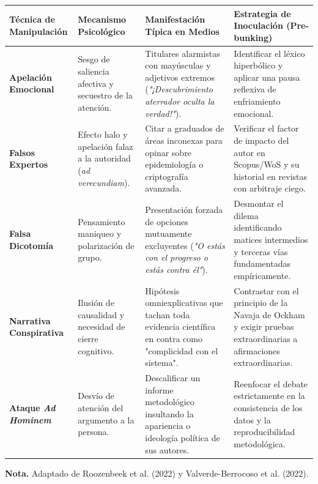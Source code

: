 \begin{table}[htpb!]
\centering
\small
\begin{tabularx}{\textwidth}{p{3.0cm} p{3.2cm} p{4.2cm} X}
\toprule
\textbf{Técnica de Manipulación} & \textbf{Mecanismo Psicológico} & \textbf{Manifestación Típica en Medios} & \textbf{Estrategia de Inoculación (Pre-bunking)} \\
\midrule
\textbf{Apelación Emocional} & Sesgo de saliencia afectiva y secuestro de la atención. & Titulares alarmistas con mayúsculas y adjetivos extremos (\textit{"¡Descubrimiento aterrador oculta la verdad!"}). & Identificar el léxico hiperbólico y aplicar una pausa reflexiva de enfriamiento emocional. \\
\midrule
\textbf{Falsos Expertos} & Efecto halo y apelación falaz a la autoridad (\textit{ad verecundiam}). & Citar a graduados de áreas inconexas para opinar sobre epidemiología o criptografía avanzada. & Verificar el factor de impacto del autor en Scopus/WoS y su historial en revistas con arbitraje ciego. \\
\midrule
\textbf{Falsa Dicotomía} & Pensamiento maniqueo y polarización de grupo. & Presentación forzada de opciones mutuamente excluyentes (\textit{"O estás con el progreso o estás contra él"}). & Desmontar el dilema identificando matices intermedios y terceras vías fundamentadas empíricamente. \\
\midrule
\textbf{Narrativa Conspirativa} & Ilusión de causalidad y necesidad de cierre cognitivo. & Hipótesis omniexplicativas que tachan toda evidencia científica en contra como "complicidad con el sistema". & Contrastar con el principio de la Navaja de Ockham y exigir pruebas extraordinarias a afirmaciones extraordinarias. \\
\midrule
\textbf{Ataque \textit{Ad Hominem}} & Desvío de atención del argumento a la persona. & Descalificar un informe metodológico insultando la apariencia o ideología política de sus autores. & Reenfocar el debate estrictamente en la consistencia de los datos y la reproducibilidad metodológica. \\
\bottomrule
\end{tabularx}
\vspace{0.2cm}
\begin{flushleft}
\scriptsize \textbf{Nota.} Adaptado de Roozenbeek et al. (2022) y Valverde-Berrocoso et al. (2022).
\end{flushleft}
\end{table}

\newpage

